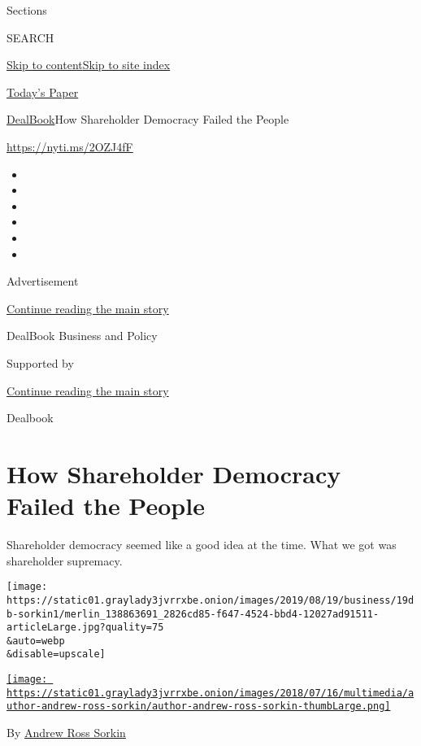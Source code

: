 Sections

SEARCH

\protect\hyperlink{site-content}{Skip to
content}\protect\hyperlink{site-index}{Skip to site index}

\href{https://myaccount.nytimes3xbfgragh.onion/auth/login?response_type=cookie\&client_id=vi}{}

\href{https://www.nytimes3xbfgragh.onion/section/todayspaper}{Today's
Paper}

\href{/section/business/dealbook}{DealBook}\textbar{}How Shareholder
Democracy Failed the People

\url{https://nyti.ms/2OZJ4fF}

\begin{itemize}
\item
\item
\item
\item
\item
\item
\end{itemize}

Advertisement

\protect\hyperlink{after-top}{Continue reading the main story}

DealBook Business and Policy

Supported by

\protect\hyperlink{after-sponsor}{Continue reading the main story}

Dealbook

\hypertarget{how-shareholder-democracy-failed-the-people}{%
\section{How Shareholder Democracy Failed the
People}\label{how-shareholder-democracy-failed-the-people}}

Shareholder democracy seemed like a good idea at the time. What we got
was shareholder supremacy.

\texttt{[image: https://static01.graylady3jvrrxbe.onion/images/2019/08/19/business/19db-sorkin1/merlin\_138863691\_2826cd85-f647-4524-bbd4-12027ad91511-articleLarge.jpg?quality=75\\\&auto=webp\\\&disable=upscale]}

\href{https://www.nytimes3xbfgragh.onion/by/andrew-ross-sorkin}{\texttt{[image: https://static01.graylady3jvrrxbe.onion/images/2018/07/16/multimedia/author-andrew-ross-sorkin/author-andrew-ross-sorkin-thumbLarge.png]}}

By
\href{https://www.nytimes3xbfgragh.onion/by/andrew-ross-sorkin}{Andrew
Ross Sorkin}

